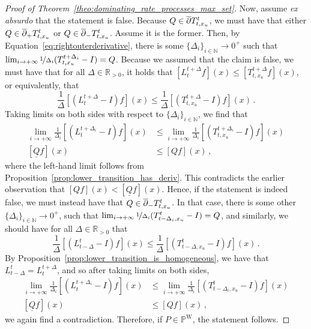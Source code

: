 \documentclass[10pt]{paper}
\theoremstyle{definition}
\newcommand{\nats}{\mathbb{N}}
\newcommand{\reals}{\mathbb{R}}
\newcommand{\realspos}{\reals_{>0}}
\newcommand{\processes}{\mathbb{P}}
\newcommand{\wprocesses}{\processes^{\mathrm{W}}}
\newcommand{\lrate}{\underline{Q}}
\begin{document}
\begin{proof}[Proof of Theorem~\ref{theo:dominating_rate_processes_max_set}]
Now, assume \emph{ex absurdo} that the statement is false. Because $Q\in\smash{\overline{\partial}}T_{t,x_u}^{t}$, we must have that either $Q\in\smash{\overline{\partial}}_+T_{t,x_u}^{t}$ or $Q\in\smash{\overline{\partial}}_-T_{t,x_u}^{t}$. Assume it is the former. Then, by Equation~\ref{eq:rightouterderivative}, there is some $\{\Delta_i\}_{i\in\nats}\to0^+$ such that $\lim_{i\to+\infty}\nicefrac{1}{\Delta_i}(T_{t,x_u}^{t+\Delta_i}-I)=Q$. Because we assumed that the claim is false, we must have that for all $\Delta\in\realspos$, it holds that $\left[L_t^{t+\Delta}f\right](x) \leq \left[T_{t,x_u}^{t+\Delta}f\right](x)$,
or equivalently, that
\begin{equation*}
\frac{1}{\Delta}\left[(L_t^{t+\Delta} - I)f\right](x) \leq \frac{1}{\Delta}\left[(T_{t,x_u}^{t+\Delta} - I)f\right](x)\,.
\end{equation*}
Taking limits on both sides with respect to $\{\Delta_i\}_{i\in\nats}$, we find that
\begin{align*}
\lim_{i\to+\infty}\frac{1}{\Delta_i}\left[(L_t^{t+\Delta_i} - I)f\right](x) &\leq \lim_{i\to+\infty}\frac{1}{\Delta_i}\left[(T_{t,x_u}^{t+\Delta_i} - I)f\right](x) \\
\left[\lrate f\right](x) &\leq \left[Qf\right](x)\,,
\end{align*}
where the left-hand limit follows from Proposition~\ref{prop:lower_transition_has_deriv}. This contradicts the earlier observation that $\left[Qf\right](x)<\left[\lrate f\right](x)$. Hence, if the statement is indeed false, we must instead have that $Q\in\smash{\overline{\partial}}_-T_{t,x_u}^{t}$. In that case, there is some other $\{\Delta_i\}_{i\in\nats}\to0^+$, such that $\lim_{i\to+\infty}\nicefrac{1}{\Delta_i}(T_{t-\Delta_i,x_u}^{t}-I)=Q$, and similarly, we should have for all $\Delta\in\realspos$ that
\begin{equation*}
\frac{1}{\Delta}\left[(L_{t-\Delta}^{t} - I)f\right](x) \leq \frac{1}{\Delta}\left[(T_{t-\Delta,x_u}^{t} - I)f\right](x)\,.
\end{equation*}
By Proposition~\ref{prop:lower_transition_is_homogeneous}, we have that $L_{t-\Delta}^{t}=L_{t}^{t+\Delta}$, and so after taking limits on both sides,
\begin{align*}
\lim_{i\to+\infty}\frac{1}{\Delta_i}\left[(L_t^{t+\Delta_i} - I)f\right](x) &\leq \lim_{i\to+\infty}\frac{1}{\Delta_i}\left[(T_{t-\Delta_i,x_u}^{t} - I)f\right](x) \\
\left[\lrate f\right](x) &\leq \left[Qf\right](x)\,,
\end{align*}
we again find a contradiction. Therefore, if $P\in\wprocesses$, the statement follows.


\end{proof}
\end{document}
